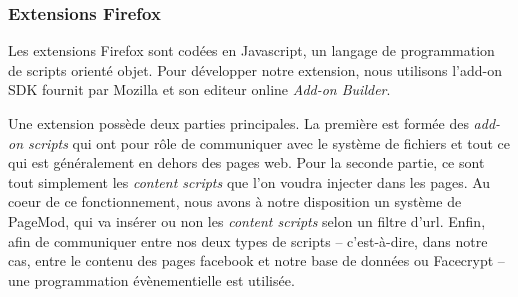 \documentclass[a4paper,11pt,french]{article}
\begin{document}
\subsubsection{Extensions Firefox}
Les extensions Firefox sont codées en Javascript, un langage de programmation de 
scripts orienté objet. Pour développer notre extension, nous utilisons l'add-on 
SDK fournit par Mozilla et son editeur online \emph{Add-on Builder}.

Une extension possède deux parties principales. La première est formée des 
\emph{add-on scripts} qui ont pour rôle de communiquer avec le système de fichiers 
et tout ce qui est généralement en dehors des pages web. Pour la seconde partie, 
ce sont tout simplement les \emph{content scripts} que l'on voudra injecter dans
les pages. Au coeur de ce fonctionnement, nous avons à notre disposition un système 
de PageMod, qui va insérer ou non les \emph{content scripts} selon un filtre d'url. 
Enfin, afin de communiquer entre nos deux types de scripts -- c'est-à-dire, dans notre
cas, entre le contenu des pages facebook et notre base de données ou Facecrypt -- 
une programmation évènementielle est utilisée.
\end{document}
